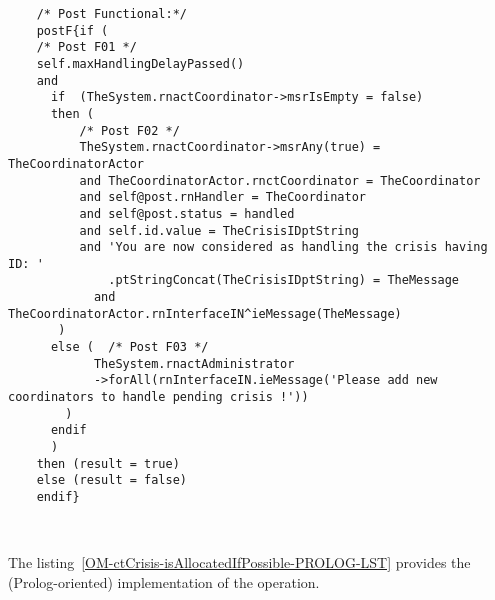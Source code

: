 	\scriptsize
	\vspace{0.5cm}
	\begin{lstlisting}[style=MessirStyle,firstnumber=auto,captionpos=b,caption={\msrmessir (MCL-oriented) specification of the operation \emph{isAllocatedIfPossible}.},label=OM-ctCrisis-isAllocatedIfPossible-MCL-LST]

	
	
	/* Post Functional:*/ 
	postF{if (   
	/* Post F01 */
	self.maxHandlingDelayPassed()
	and 
	  if  (TheSystem.rnactCoordinator->msrIsEmpty = false)
	  then (
	      /* Post F02 */
	      TheSystem.rnactCoordinator->msrAny(true) = TheCoordinatorActor
	      and TheCoordinatorActor.rnctCoordinator = TheCoordinator
	      and self@post.rnHandler = TheCoordinator
	      and self@post.status = handled
	      and self.id.value = TheCrisisIDptString
	      and 'You are now considered as handling the crisis having ID: '
	          .ptStringConcat(TheCrisisIDptString) = TheMessage
	        and TheCoordinatorActor.rnInterfaceIN^ieMessage(TheMessage)
	   )
	  else (  /* Post F03 */
	        TheSystem.rnactAdministrator
	        ->forAll(rnInterfaceIN.ieMessage('Please add new coordinators to handle pending crisis !'))
	    )
	  endif
	  )
	then (result = true)
	else (result = false)
	endif}
	
	
	\end{lstlisting}
	\normalsize 
	
	
	
	
	
	\vspace{1cm}
	The listing~\ref{OM-ctCrisis-isAllocatedIfPossible-PROLOG-LST} provides the \msrmessir (Prolog-oriented) implementation of the operation.
	
	\scriptsize
	\vspace{0.5cm}
	
	
	\normalsize





